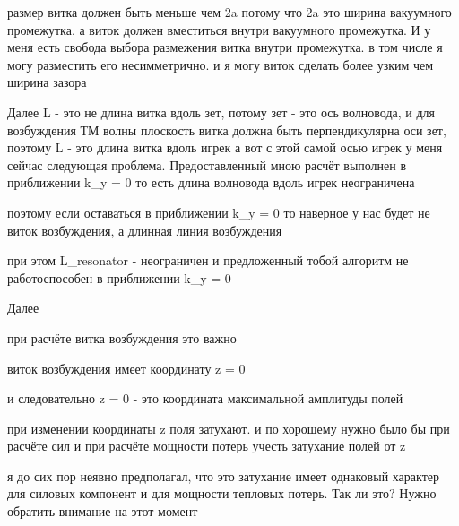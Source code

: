\documentclass[11pt]{article}
\makeatletter
\newcommand{\boxspacing}{\kern\kvtcb@left@rule\kern\kvtcb@boxsep}
\newcommand{\prompt}[4]{
        {\ttfamily\llap{{\color{#2}[#3]:\hspace{3pt}#4}}\vspace{-\baselineskip}}
    }
\makeatother
\begin{document}
    \begin{tcolorbox}[breakable, size=fbox, boxrule=1pt, pad at break*=1mm,colback=cellbackground, colframe=cellborder]
\prompt{In}{incolor}{ }{\boxspacing}
\begin{Verbatim}[commandchars=\\\{\}]

\end{Verbatim}
\end{tcolorbox}

    размер витка должен быть меньше чем 2a потому что 2a это ширина
вакуумного промежутка. а виток должен вместиться внутри вакуумного
промежутка. И у меня есть свобода выбора размежения витка внутри
промежутка. в том числе я могу разместить его несимметрично. и я могу
виток сделать более узким чем ширина зазора

Далее L - это не длина витка вдоль зет, потому зет - это ось волновода,
и для возбуждения ТМ волны плоскость витка должна быть перпендикулярна
оси зет, поэтому L - это длина витка вдоль игрек а вот с этой самой осью
игрек у меня сейчас следующая проблема. Предоставленный мною расчёт
выполнен в приближении k\_y = 0 то есть длина волновода вдоль игрек
неограничена

поэтому если оставаться в приближении k\_y = 0 то наверное у нас будет
не виток возбуждения, а длинная линия возбуждения

при этом L\_resonator - неограничен и предложенный тобой алгоритм не
работоспособен в приближении k\_y = 0

Далее

при расчёте витка возбуждения это важно

виток возбуждения имеет координату z = 0

и следовательно z = 0 - это координата максимальной амплитуды полей

при изменении координаты z поля затухают. и по хорошему нужно было бы
при расчёте сил и при расчёте мощности потерь учесть затухание полей от
z

я до сих пор неявно предполагал, что это затухание имеет однаковый
характер для силовых компонент и для мощности тепловых потерь. Так ли
это? Нужно обратить внимание на этот момент

    \begin{tcolorbox}[breakable, size=fbox, boxrule=1pt, pad at break*=1mm,colback=cellbackground, colframe=cellborder]
\prompt{In}{incolor}{ }{\boxspacing}
\begin{Verbatim}[commandchars=\\\{\}]

\end{Verbatim}
\end{tcolorbox}
\end{document}
